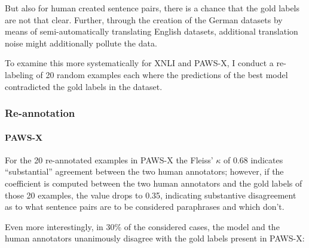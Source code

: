 But also for human created sentence pairs, there
is a chance that the gold labels are not that clear. Further, through the creation of the German
datasets by means of semi-automatically translating English datasets, additional translation
noise might additionally pollute the data.

To examine this more systematically for XNLI and PAWS-X, I conduct a re-labeling of 20 random
examples each  where the predictions of the best model contradicted the gold labels in the dataset.


\subsubsection{Re-annotation}

\paragraph*{PAWS-X}

For the 20 re-annotated examples in PAWS-X the Fleiss' $\kappa$ of 0.68 indicates ``substantial'' agreement
between the two human annotators; however, if the coefficient is computed between the two human annotators
and the gold labels of those 20 examples, the value drops to 0.35, indicating substantive disagreement
as to what sentence pairs are to be considered paraphrases and which don't.

Even more interestingly, in 30\% of the considered cases, the model and the human annotators unanimously
disagree with the gold labels present in PAWS-X:



